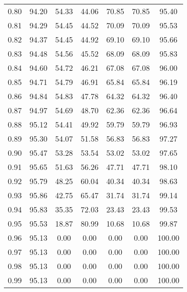 \begin{tabular}{|c|c|c|c|c|c|c|}
      0.80 &     94.20 &     54.33 &      44.06 &   70.85 &      70.85 &         95.40 \\
      0.81 &     94.29 &     54.45 &      44.52 &   70.09 &      70.09 &         95.53 \\
      0.82 &     94.37 &     54.45 &      44.92 &   69.10 &      69.10 &         95.66 \\
      0.83 &     94.48 &     54.56 &      45.52 &   68.09 &      68.09 &         95.83 \\
      0.84 &     94.60 &     54.72 &      46.21 &   67.08 &      67.08 &         96.00 \\
      0.85 &     94.71 &     54.79 &      46.91 &   65.84 &      65.84 &         96.19 \\
      0.86 &     94.84 &     54.83 &      47.78 &   64.32 &      64.32 &         96.40 \\
      0.87 &     94.97 &     54.69 &      48.70 &   62.36 &      62.36 &         96.64 \\
      0.88 &     95.12 &     54.41 &      49.92 &   59.79 &      59.79 &         96.93 \\
      0.89 &     95.30 &     54.07 &      51.58 &   56.83 &      56.83 &         97.27 \\
      0.90 &     95.47 &     53.28 &      53.54 &   53.02 &      53.02 &         97.65 \\
      0.91 &     95.65 &     51.63 &      56.26 &   47.71 &      47.71 &         98.10 \\
      0.92 &     95.79 &     48.25 &      60.04 &   40.34 &      40.34 &         98.63 \\
      0.93 &     95.86 &     42.75 &      65.47 &   31.74 &      31.74 &         99.14 \\
      0.94 &     95.83 &     35.35 &      72.03 &   23.43 &      23.43 &         99.53 \\
      0.95 &     95.53 &     18.87 &      80.99 &   10.68 &      10.68 &         99.87 \\
      0.96 &     95.13 &      0.00 &       0.00 &    0.00 &       0.00 &        100.00 \\
      0.97 &     95.13 &      0.00 &       0.00 &    0.00 &       0.00 &        100.00 \\
      0.98 &     95.13 &      0.00 &       0.00 &    0.00 &       0.00 &        100.00 \\
      0.99 &     95.13 &      0.00 &       0.00 &    0.00 &       0.00 &        100.00 \\
\bottomrule
\end{tabular}

